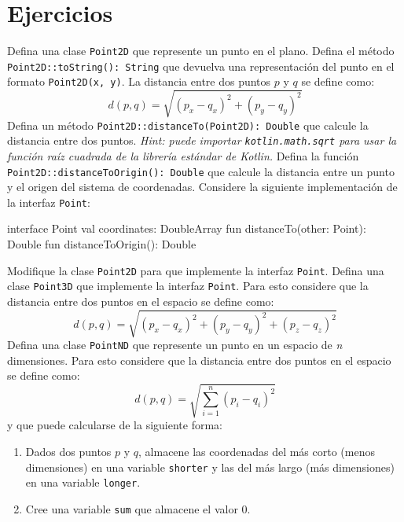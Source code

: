 \newpage
\section{Ejercicios}
  \label{sec:oop:principios:ejercicios}

  \begin{Exercise}[title={Puntos en el espacio}, label={oop:principios:ejercicios:puntos}]
    \Question Defina una clase \texttt{Point2D} que represente un punto en el plano.
    \Question Defina el método \texttt{Point2D::toString(): String} que devuelva una representación del 
      punto en el formato \texttt{Point2D(x, y)}.
    \Question La distancia entre dos puntos \(p\) y \(q\) se define como:
      \[d(p, q) = \sqrt{(p_x - q_x)^2 + (p_y - q_y)^2}\]
      Defina un método \texttt{Point2D::distanceTo(Point2D): Double} que calcule la distancia entre dos 
      puntos.
      \textit{Hint: puede importar \texttt{kotlin.math.sqrt} para usar la función raíz cuadrada de 
      la librería estándar de \textit{Kotlin}.}
    \Question Defina la función \texttt{Point2D::distanceToOrigin(): Double} que calcule la 
      distancia entre un punto y el origen del sistema de coordenadas.
    \Question Considere la siguiente implementación de la interfaz \texttt{Point}:
      \begin{kotlin}
        interface Point {
          val coordinates: DoubleArray
          fun distanceTo(other: Point): Double
          fun distanceToOrigin(): Double
        }
      \end{kotlin}
      Modifique la clase \texttt{Point2D} para que implemente la interfaz \texttt{Point}.
    \Question Defina una clase \texttt{Point3D} que implemente la interfaz \texttt{Point}.
      Para esto considere que la distancia entre dos puntos en el espacio se define como:
      \[d(p, q) = \sqrt{(p_x - q_x)^2 + (p_y - q_y)^2 + (p_z - q_z)^2}\]
    \Question Defina una clase \texttt{PointND} que represente un punto en un espacio de 
      \textit{n} dimensiones.
      Para esto considere que la distancia entre dos puntos en el espacio se define como:
      \[d(p, q) = \sqrt{\sum_{i=1}^n (p_i - q_i)^2}\]
      y que puede calcularse de la siguiente forma:
      \begin{enumerate}
        \item Dados dos puntos \(p\) y \(q\), almacene las coordenadas del más corto (menos 
          dimensiones) en una variable \texttt{shorter} y las del más largo (más dimensiones) en una
          variable \texttt{longer}.
        \item Cree una variable \texttt{sum} que almacene el valor 0.

\end{enumerate}
\end{Exercise}
